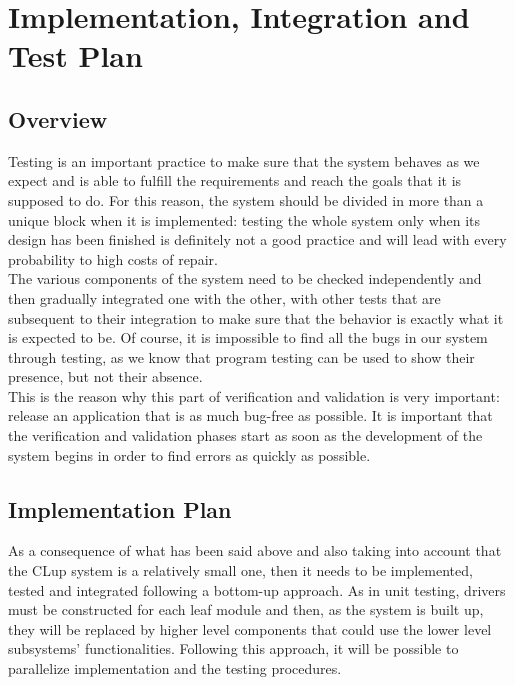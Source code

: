 \documentclass[]{article}
\begin{document}
		\newpage
		
		\section{Implementation, Integration and Test Plan}
			 \bigskip
			 
			 \subsection{Overview}
			 \medskip
			 Testing is an important practice to make sure that the system behaves as we expect and is able to fulfill the requirements and reach the goals that it is supposed to do. For this reason, the system should be divided in more than a unique block when it is implemented: testing the whole system only when its design has been finished is definitely not a good practice and will lead with every probability to high costs of repair. \\The various components of the system need to be checked independently and then gradually integrated one with the other, with other tests that are subsequent to their integration to make sure that the behavior is exactly what it is expected to be. Of course, it is impossible to find all the bugs in our system through testing, as we know that program testing can be used to show their presence, but not their absence. \\This is the reason why this part of verification and validation is very important: release an application that is as much bug-free as possible. It is important that the verification and validation phases start as soon as the development of the system begins in order to find errors as quickly as possible.\newline\newline
			
			\subsection{Implementation Plan}
			\medskip
			As a consequence of what has been said above and also taking into account that the CLup system is a relatively small one, then it needs to be implemented, tested and integrated following a bottom-up approach. As in unit testing, drivers must be constructed for each leaf module and then, as the system is built up, they will be replaced by higher level components that could use the lower level subsystems’ functionalities. Following this approach, it will be possible to parallelize implementation and the testing procedures.\newline
\end{document}
